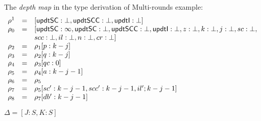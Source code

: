 The \emph{depth map} in the type derivation of Multi-rounds example:
\[
\begin{array}{lll}
\dmap^1     & = & [\mathsf{updtSC}: \bot, \mathsf{updtSCC}: \bot, \mathsf{updtI}: \bot] \\
%
\dmap_0   & = & [\mathsf{updtSC}: \infty, \mathsf{updtSC}: \bot, 
                  \mathsf{updtSCC}: \bot, \mathsf{updtI}: \bot, 
                  z: \bot, k : \bot, j : \bot, sc: \bot,\\
            &   & scc: \bot, il : \bot, n : \bot, cr: \bot] \\
%
\dmap_2   & = & \dmap_1[p : k - j]\\
\dmap_3   & = & \dmap_2[q : k - j]\\
\dmap_4   & = & \dmap_3[qc : 0]\\
\dmap_5   & = & \dmap_4[a : k - j - 1]\\
\dmap_6   & = & \dmap_5\\
\dmap_7   & = & \dmap_5[sc' : k - j - 1, scc' : k - j - 1, il' ; k - j - 1]\\
\dmap_8   & = & \dmap_7[db' : k - j - 1]\\
\end{array}
\]

$\Delta = [J : S, K : S]$


